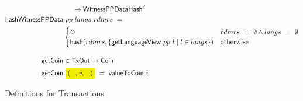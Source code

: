 \begin{figure*}[htb]
\begin{align*}
    & ~~~~ \to \WitnessPPDataHash^? \\
    \fun{hashWitnessPPData}&~{pp}~{langs}~{rdmrs}~=~ \\
                          &\begin{cases}
                            \Nothing & rdmrs~=~\emptyset \land langs~=~\emptyset \\
                            \fun{hash} (rdmrs, \{ \fun{getLanguageView}~pp~l \mid l \in langs \}) & \text{otherwise}
                          \end{cases}
    \nextdef
    \fun{getCoin}& \in \TxOut \to \Coin \\
    \fun{getCoin}&~\hldiff{{(\_, \var{v}, \_)}} ~=~\fun{valueToCoin}~{v}
  \end{align*}
  \caption{Definitions for Transactions}
  \label{fig:defs:utxo-shelley-1}
\end{figure*}


